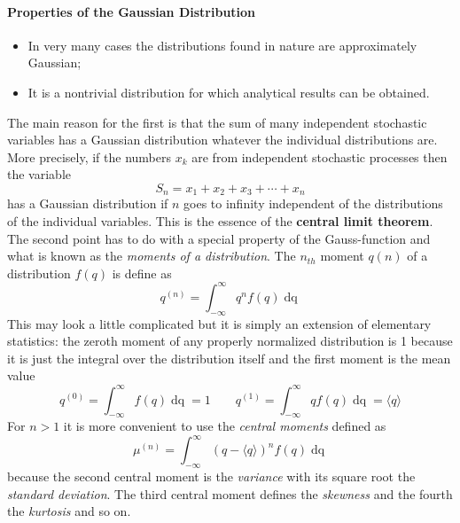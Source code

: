 \paragraph{Properties of the Gaussian Distribution}
\begin{itemize}
	\item In very many cases the distributions found in nature are approximately Gaussian;
	\item It is a nontrivial distribution for which analytical results can be obtained.
\end{itemize}
The main reason for the first is that the sum of many independent stochastic variables has a Gaussian distribution whatever the individual distributions are.
More precisely, if the numbers $x_k$ are from independent stochastic processes then the variable
\begin{equation}
S_n=x_1+x_2+x_3+\cdots+x_n
\end{equation}
has a Gaussian distribution if $n$ goes to infinity independent of the distributions of the individual variables. This is the essence of the \textbf{central limit theorem}.\\
The second point has to do with a special property of the Gauss-function and what is known as the \emph{moments of a distribution}.
The $n_{th}$ moment $q(n)$ of a distribution $f(q)$ is define as
\begin{equation}
	q^{(n)}=\int_{-\infty}^\infty q^n f(q)\mathop{dq}
\end{equation}
This may look a little complicated but it is simply an extension of elementary statistics: the zeroth moment of any properly normalized distribution is 1 because it is just the integral over the distribution itself and the first moment is the mean value
\begin{equation}
	q^{(0)}=\int_{-\infty}^\infty f(q)\mathop{dq}=1\qquad q^{(1)}=\int_{-\infty}^\infty qf(q)\mathop{dq}=\langle q\rangle
\end{equation}
For $n>1$ it is more convenient to use the \emph{central moments} defined as
\begin{equation}
	\mu^{(n)}=\int_{-\infty}^\infty (q-\langle q\rangle)^n f(q)\mathop{dq}
\end{equation}
because the second central moment is the \emph{variance} with its square root the \emph{standard deviation}.
The third central moment defines the \emph{skewness} and the fourth the \emph{kurtosis} and so on.

